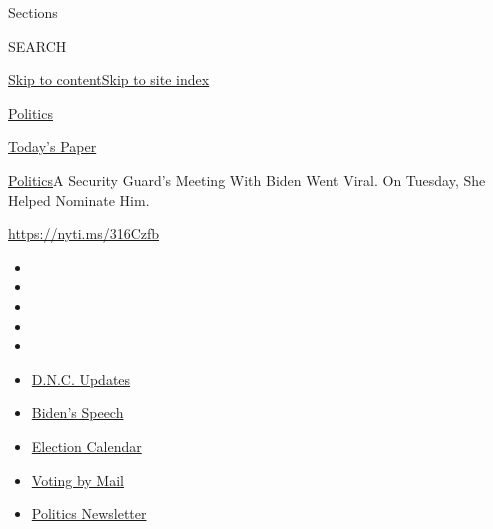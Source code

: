 Sections

SEARCH

\protect\hyperlink{site-content}{Skip to
content}\protect\hyperlink{site-index}{Skip to site index}

\href{https://www.nytimes3xbfgragh.onion/section/politics}{Politics}

\href{https://myaccount.nytimes3xbfgragh.onion/auth/login?response_type=cookie\&client_id=vi}{}

\href{https://www.nytimes3xbfgragh.onion/section/todayspaper}{Today's
Paper}

\href{/section/politics}{Politics}\textbar{}A Security Guard's Meeting
With Biden Went Viral. On Tuesday, She Helped Nominate Him.

\url{https://nyti.ms/316Czfb}

\begin{itemize}
\item
\item
\item
\item
\item
\end{itemize}

\begin{itemize}
\item
  \href{https://www.nytimes3xbfgragh.onion/live/2020/08/20/us/dnc-convention-election?action=click\&pgtype=Article\&state=default\&region=TOP_BANNER\&context=storylines_menu}{D.N.C.
  Updates}
\item
  \href{https://www.nytimes3xbfgragh.onion/2020/08/20/us/politics/biden-presidential-nomination-dnc.html?action=click\&pgtype=Article\&state=default\&region=TOP_BANNER\&context=storylines_menu}{Biden's
  Speech}
\item
  \href{https://www.nytimes3xbfgragh.onion/interactive/2019/us/elections/2020-presidential-election-calendar.html?action=click\&pgtype=Article\&state=default\&region=TOP_BANNER\&context=storylines_menu}{Election
  Calendar}
\item
  \href{https://www.nytimes3xbfgragh.onion/interactive/2020/08/11/us/politics/vote-by-mail-us-states.html?action=click\&pgtype=Article\&state=default\&region=TOP_BANNER\&context=storylines_menu}{Voting
  by Mail}
\item
  \href{https://www.nytimes3xbfgragh.onion/newsletters/politics?action=click\&pgtype=Article\&state=default\&region=TOP_BANNER\&context=storylines_menu}{Politics
  Newsletter}
\end{itemize}

